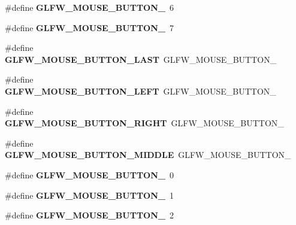 \begin{DoxyCompactItemize}
\mbox{\label{group__buttons_ga8b02a1ab55dde45b3a3883d54ffd7dc7}} 
\#define {\bfseries G\+L\+F\+W\+\_\+\+M\+O\+U\+S\+E\+\_\+\+B\+U\+T\+T\+O\+N\+\_}~6
\item 
\mbox{\label{group__buttons_ga35d5c4263e0dc0d0a4731ca6c562f32c}} 
\#define {\bfseries G\+L\+F\+W\+\_\+\+M\+O\+U\+S\+E\+\_\+\+B\+U\+T\+T\+O\+N\+\_}~7
\item 
\mbox{\label{group__buttons_gab1fd86a4518a9141ec7bcde2e15a2fdf}} 
\#define {\bfseries G\+L\+F\+W\+\_\+\+M\+O\+U\+S\+E\+\_\+\+B\+U\+T\+T\+O\+N\+\_\+\+L\+A\+ST}~G\+L\+F\+W\+\_\+\+M\+O\+U\+S\+E\+\_\+\+B\+U\+T\+T\+O\+N\+\_
\item 
\mbox{\label{group__buttons_gaf37100431dcd5082d48f95ee8bc8cd56}} 
\#define {\bfseries G\+L\+F\+W\+\_\+\+M\+O\+U\+S\+E\+\_\+\+B\+U\+T\+T\+O\+N\+\_\+\+L\+E\+FT}~G\+L\+F\+W\+\_\+\+M\+O\+U\+S\+E\+\_\+\+B\+U\+T\+T\+O\+N\+\_
\item 
\mbox{\label{group__buttons_ga3e2f2cf3c4942df73cc094247d275e74}} 
\#define {\bfseries G\+L\+F\+W\+\_\+\+M\+O\+U\+S\+E\+\_\+\+B\+U\+T\+T\+O\+N\+\_\+\+R\+I\+G\+HT}~G\+L\+F\+W\+\_\+\+M\+O\+U\+S\+E\+\_\+\+B\+U\+T\+T\+O\+N\+\_
\item 
\mbox{\label{group__buttons_ga34a4d2a701434f763fd93a2ff842b95a}} 
\#define {\bfseries G\+L\+F\+W\+\_\+\+M\+O\+U\+S\+E\+\_\+\+B\+U\+T\+T\+O\+N\+\_\+\+M\+I\+D\+D\+LE}~G\+L\+F\+W\+\_\+\+M\+O\+U\+S\+E\+\_\+\+B\+U\+T\+T\+O\+N\+\_
\item 
\mbox{\label{group__buttons_ga181a6e875251fd8671654eff00f9112e}} 
\#define {\bfseries G\+L\+F\+W\+\_\+\+M\+O\+U\+S\+E\+\_\+\+B\+U\+T\+T\+O\+N\+\_}~0
\item 
\mbox{\label{group__buttons_ga604b39b92c88ce9bd332e97fc3f4156c}} 
\#define {\bfseries G\+L\+F\+W\+\_\+\+M\+O\+U\+S\+E\+\_\+\+B\+U\+T\+T\+O\+N\+\_}~1
\item 
\mbox{\label{group__buttons_ga0130d505563d0236a6f85545f19e1721}} 
\#define {\bfseries G\+L\+F\+W\+\_\+\+M\+O\+U\+S\+E\+\_\+\+B\+U\+T\+T\+O\+N\+\_}~2

\end{DoxyCompactItemize}
